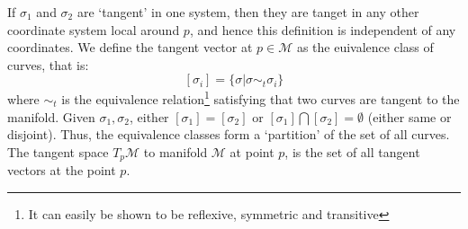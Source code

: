 If $\sigma_1$ and $\sigma_2$ are `tangent' in one system, then they are tanget in any other coordinate system local around $p$, and hence this definition is independent of any coordinates. We define the tangent vector at $p \in \mathcal{M}$ as the euivalence class of curves, that is:
$$[\sigma_i] = \{\sigma | \sigma \sim_t \sigma_i \}$$
where $\sim_t$ is the equivalence relation\footnote{It can easily be shown to be reflexive, symmetric and transitive} satisfying that two curves are tangent to the manifold. Given $\sigma_1, \sigma_2$, either $[\sigma_1]=[\sigma_2]$ or $[\sigma_1]\bigcap [\sigma_2] = \emptyset$ (either same or disjoint). Thus, the equivalence classes form a `partition' of the set of all curves. The tangent space $T_p\mathcal{M}$ to manifold $\mathcal{M}$ at point $p$, is the set of all tangent vectors at the point $p$.  

